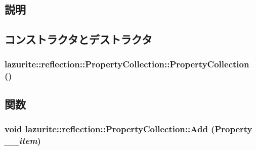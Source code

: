 \subsection{説明}


\subsection{コンストラクタとデストラクタ}
\hypertarget{classlazurite_1_1reflection_1_1_property_collection_aa0ec008f56b1fefae374c8b215bad9b0}{
\subsubsection[{PropertyCollection}]{\setlength{\rightskip}{0pt plus 5cm}lazurite::reflection::PropertyCollection::PropertyCollection ()}}
\label{classlazurite_1_1reflection_1_1_property_collection_aa0ec008f56b1fefae374c8b215bad9b0}


\subsection{関数}
\hypertarget{classlazurite_1_1reflection_1_1_property_collection_a6f5ed0aab0460c7ff49aef432f856da3}{
\subsubsection[{Add}]{\setlength{\rightskip}{0pt plus 5cm}void lazurite::reflection::PropertyCollection::Add ({\bf Property} {\em \_\-\_\-item})}}
\label{classlazurite_1_1reflection_1_1_property_collection_a6f5ed0aab0460c7ff49aef432f856da3}

